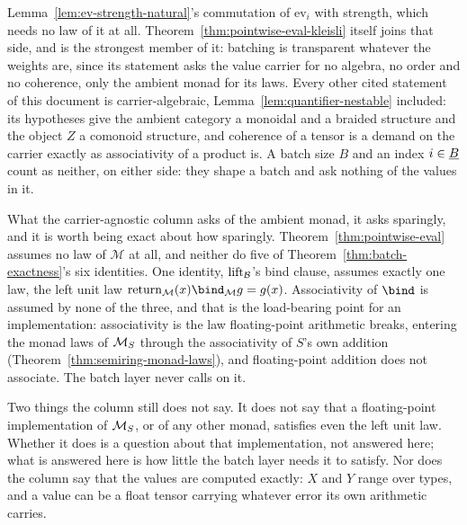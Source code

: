 Lemma~\ref{lem:ev-strength-natural}'s commutation of $\mathrm{ev}_i$
with strength, which needs no law of it at all. Theorem~\ref{thm:pointwise-eval-kleisli}
itself joins that side, and is the strongest member of it: batching is
transparent whatever the weights are, since its statement asks the value
carrier for no algebra, no order and no coherence, only the ambient monad
for its laws. Every other cited
statement of this document is carrier-algebraic,
Lemma~\ref{lem:quantifier-nestable} included: its hypotheses give the
ambient category a monoidal and a
braided structure and the object $Z$ a comonoid structure, and
coherence of a tensor is a demand on the carrier exactly as
associativity of a product is. A batch size $B$ and an index
$i \in \underline B$ count as neither, on either side: they shape a batch and
ask nothing of the values in it.

What the carrier-agnostic column asks of the ambient monad, it asks
sparingly, and it is worth being exact about how sparingly.
Theorem~\ref{thm:pointwise-eval} assumes no law of $\mathcal M$ at all,
and neither do five of Theorem~\ref{thm:batch-exactness}'s six
identities. One identity, $\mathrm{lift}_{\mathcal B}$'s bind clause, assumes
exactly one law, the left unit law
$\Ret_{\mathcal M}(x) \bind_{\mathcal M} g = g(x)$. Associativity of
$\bind$ is assumed by none of the three, and that is the load-bearing
point for an implementation: associativity is the law floating-point
arithmetic breaks, entering the monad laws of $\mathcal M_{S}$ through the
associativity of $S$'s own addition
(Theorem~\ref{thm:semiring-monad-laws}), and floating-point addition
does not associate. The batch layer never calls on it.

Two things the column still does not say. It does not say that a
floating-point implementation of $\mathcal M_{S}$, or of any other monad,
satisfies even the left unit law. Whether it does is a question about
that implementation, not answered here; what is answered here is how
little the batch layer needs it to satisfy. Nor does the column say
that the values are computed exactly: $X$ and $Y$ range over types, and
a value can be a float tensor carrying whatever error its own
arithmetic carries.


